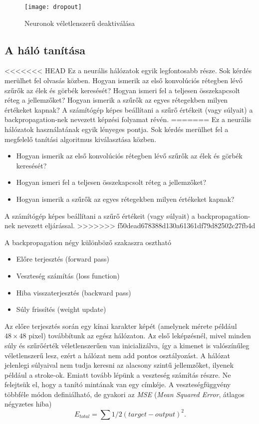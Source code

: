 \begin{figure}
\centering
\texttt{[image: dropout]}
\caption{Neuronok véletlenszerű deaktiválása}
\label{fig:dropout}
\end{figure} 

\subsection{A háló tanítása}

<<<<<<< HEAD
Ez a neurális hálózatok\cite{neurális77} egyik legfontosabb része. Sok kérdés merülhet fel olvasás közben. Hogyan ismerik az első konvolúciós rétegben lévő szűrők az élek és görbék keresését? Hogyan ismeri fel a teljesen összekapcsolt réteg a jellemzőket? Hogyan ismerik a szűrők az egyes rétegekben milyen értékeket kapnak? A számítógép képes beállítani a szűrő értékeit (vagy súlyait) a backpropagation-nek nevezett képzési folyamat révén.
=======
Ez a neurális hálózatok használatának egyik lényeges pontja. Sok kérdés merülhet fel a megfelelő tanítási algoritmus kiválasztása közben.
\begin{itemize}
\item Hogyan ismerik az első konvolúciós rétegben lévő szűrők az élek és görbék keresését?
\item Hogyan ismeri fel a teljesen összekapcsolt réteg a jellemzőket?
\item Hogyan ismerik a szűrők az egyes rétegekben milyen értékeket kapnak?
\end{itemize}
A számítógép képes beállítani a szűrő értékeit (vagy súlyait) a backpropagation-nek nevezett eljárással.
>>>>>>> f50dead678388d130a61361df79d82502c27fb4d

A backpropagation\cite{ABeginne32} négy különböző szakaszra osztható
\begin{itemize}
\item Előre terjesztés (forward pass)
\item Veszteség számítás (loss function)
\item Hiba visszaterjesztés (backward pass)
\item Súly frissítés (weight update)
\end{itemize}

Az előre terjesztés során egy kínai karakter képét (amelynek mérete például $48 \times 48$ pixel) továbbítunk az egész hálózaton. Az első leképzésnél, mivel minden súly és szűrőérték véletlenszerűen van inicializálva, így a kimenet is valószínűleg véletlenszerű lesz, ezért a hálózat nem add pontos osztályozást. A hálózat jelenlegi súlyaival nem tudja keresni az alacsony szintű jellemzőket, ilyenek például a stroke-ok. Emiatt tovább lépünk a veszteség számítás részre. Ne felejtsük el, hogy a tanító mintának van egy címkéje. A veszteségfüggvény többféle módon definiálható, de gyakori az \textit{MSE} (\textit{Mean Squared Error}, átlagos négyzetes hiba)
$$
E_{total} = \sum 1/2(target - output)^2.
$$ 

